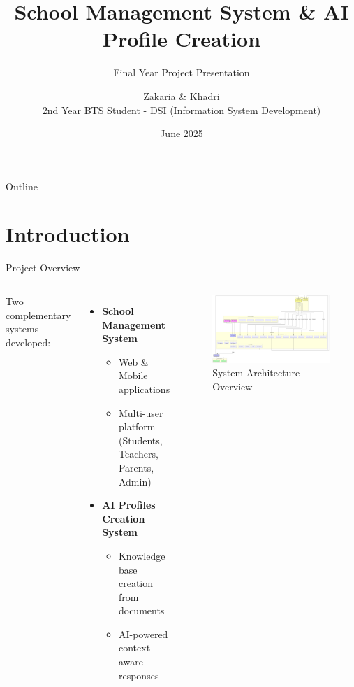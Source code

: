 \documentclass[aspectratio=169]{beamer}
\title{School Management System \& AI Profile Creation}
\subtitle{Final Year Project Presentation}
\author{Zakaria \& Khadri \\ \vspace{0.3cm} \small{2nd Year BTS Student - DSI (Information System Development)}}
\date{June 2025}
\institute{Higher School of Computer Science}
\begin{document}
\begin{frame}
    \titlepage
\end{frame}

\begin{frame}{Outline}
    \tableofcontents
\end{frame}

\section{Introduction}

\begin{frame}{Project Overview}
    \begin{columns}
        Two complementary systems developed:
        \begin{itemize}
            \item \textbf{School Management System}
            \begin{itemize}
                \item Web \& Mobile applications
                \item Multi-user platform (Students, Teachers, Parents, Admin)
            \end{itemize}
            \item \textbf{AI Profiles Creation System}
            \begin{itemize}
                \item Knowledge base creation from documents
                \item AI-powered context-aware responses
            \end{itemize}
        \end{itemize}
        \begin{figure}
            \includegraphics[width=\textwidth,height=0.6\textheight,keepaspectratio]{../pfe-pics/diagrames/archetecture.png}
            \caption{System Architecture Overview}
        \end{figure}
    \end{columns}
\end{frame}
\end{document}
